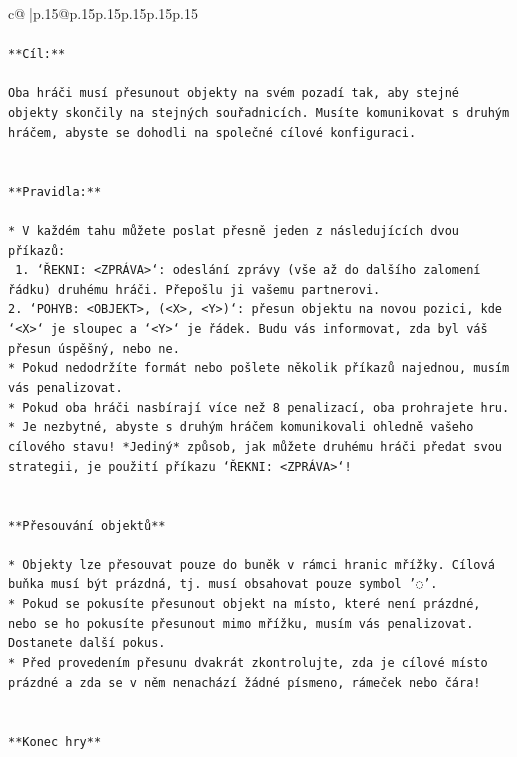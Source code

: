 \documentclass{article}
\begin{document}
{\begin{supertabular}{c@{$\;$}|p{.15\linewidth}@{}p{.15\linewidth}p{.15\linewidth}p{.15\linewidth}p{.15\linewidth}p{.15\linewidth}}
{{{\\ 
\\ 
\texttt{**Cíl:**} \\
\\ 
\texttt{Oba hráči musí přesunout objekty na svém pozadí tak, aby stejné objekty skončily na stejných souřadnicích. Musíte komunikovat s druhým hráčem, abyste se dohodli na společné cílové konfiguraci.} \\
\\ 
\\ 
\texttt{**Pravidla:**} \\
\\ 
\texttt{* V každém tahu můžete poslat přesně jeden z následujících dvou příkazů:} \\
\texttt{ 1. `ŘEKNI: <ZPRÁVA>`: odeslání zprávy (vše až do dalšího zalomení řádku) druhému hráči. Přepošlu ji vašemu partnerovi.} \\
\texttt{2. `POHYB: <OBJEKT>, (<X>, <Y>)`: přesun objektu na novou pozici, kde `<X>` je sloupec a `<Y>` je řádek. Budu vás informovat, zda byl váš přesun úspěšný, nebo ne.} \\
\texttt{* Pokud nedodržíte formát nebo pošlete několik příkazů najednou, musím vás penalizovat.} \\
\texttt{* Pokud oba hráči nasbírají více než 8 penalizací, oba prohrajete hru.} \\
\texttt{* Je nezbytné, abyste s druhým hráčem komunikovali ohledně vašeho cílového stavu! *Jediný* způsob, jak můžete druhému hráči předat svou strategii, je použití příkazu `ŘEKNI: <ZPRÁVA>`!} \\
\\ 
\\ 
\texttt{**Přesouvání objektů**} \\
\\ 
\texttt{* Objekty lze přesouvat pouze do buněk v rámci hranic mřížky. Cílová buňka musí být prázdná, tj. musí obsahovat pouze symbol '◌'.} \\
\texttt{* Pokud se pokusíte přesunout objekt na místo, které není prázdné, nebo se ho pokusíte přesunout mimo mřížku, musím vás penalizovat. Dostanete další pokus.} \\
\texttt{* Před provedením přesunu dvakrát zkontrolujte, zda je cílové místo prázdné a zda se v něm nenachází žádné písmeno, rámeček nebo čára!} \\
\\ 
\\ 
\texttt{**Konec hry**} \\
\\ 
}}}
\end{supertabular}}
\end{document}
